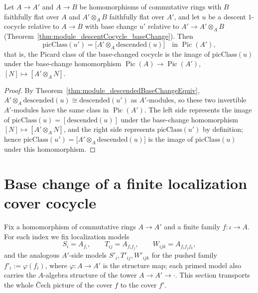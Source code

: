 \begin{theorem}
  \label{thm:module_picClass_baseChange}
  \leanok
  Let \(A \to A'\) and \(A \to B\) be homomorphisms of commutative rings with \(B\) faithfully
  flat over \(A\) and \(A' \otimes_A B\) faithfully flat over \(A'\), and let \(u\) be a descent
  \(1\)-cocycle relative to \(A \to B\) with base change \(u'\) relative to \(A' \to A'
  \otimes_A B\) (Theorem~\ref{thm:module_descentCocycle_baseChange}). Then
  \[
    \mathrm{picClass}(u') = \bigl[A' \otimes_A \mathrm{descended}(u)\bigr] \quad \text{in }
    \operatorname{Pic}(A'),
  \]
  that is, the Picard class of the base-changed cocycle is the image of \(\mathrm{picClass}(u)\)
  under the base-change homomorphism \(\operatorname{Pic}(A) \to \operatorname{Pic}(A')\),
  \([N] \mapsto [A' \otimes_A N]\).
\end{theorem}
\begin{proof}
  \leanok
  By Theorem~\ref{thm:module_descendedBaseChangeEquiv}, \(A' \otimes_A \mathrm{descended}(u)
  \cong \mathrm{descended}(u')\) as \(A'\)-modules, so these two invertible \(A'\)-modules have
  the same class in \(\operatorname{Pic}(A')\). The left side represents the image of
  \(\mathrm{picClass}(u) = [\mathrm{descended}(u)]\) under the base-change homomorphism
  \([N] \mapsto [A' \otimes_A N]\), and the right side represents \(\mathrm{picClass}(u')\) by
  definition; hence \(\mathrm{picClass}(u') = \bigl[A' \otimes_A \mathrm{descended}(u)\bigr]\)
  is the image of \(\mathrm{picClass}(u)\) under this homomorphism.
\end{proof}

\section{Base change of a finite localization cover cocycle}
\label{sec:awayCover_baseChange}

Fix a homomorphism of commutative rings \(A \to A'\) and a finite family \(f \colon \iota \to
A\).  For each index we fix localization models
\[
  S_i = A_{f_i}, \qquad T_{ij} = A_{f_i f_j}, \qquad W_{ijk} = A_{f_i f_j f_k},
\]
and the analogous \(A'\)-side models \(S'_i, T'_{ij}, W'_{ijk}\) for the pushed family
\(f'_i := \varphi(f_i)\), where \(\varphi \colon A \to A'\) is the structure map; each primed
model also carries the \(A\)-algebra structure of the tower \(A \to A' \to \cdot\).  This
section transports the whole \v Cech picture of the cover \(f\) to the cover \(f'\).

